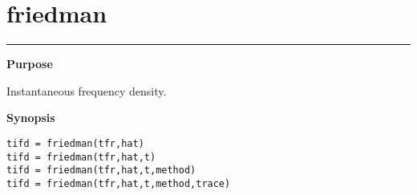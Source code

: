 


\section*{\hspace*{-1.6cm} friedman}

\vspace*{-.4cm}
\hspace*{-1.6cm}\rule[0in]{16.5cm}{.02cm}
\vspace*{.2cm}



{\bf \large \sf Purpose}\\
\hspace*{1.5cm}
\begin{minipage}[t]{13.5cm}
Instantaneous frequency density.
\end{minipage}
\vspace*{.5cm}


{\bf \large \sf Synopsis}\\
\hspace*{1.5cm}
\begin{minipage}[t]{13.5cm}
\begin{verbatim}
tifd = friedman(tfr,hat)
tifd = friedman(tfr,hat,t)
tifd = friedman(tfr,hat,t,method)
tifd = friedman(tfr,hat,t,method,trace)
\end{verbatim}
\end{minipage}
\vspace*{.5cm}


